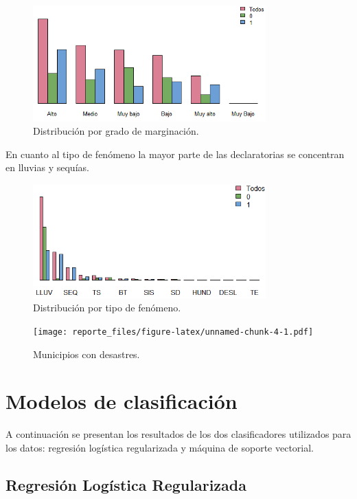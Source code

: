 \documentclass[]{article}
\begin{document}
\begin{figure}[H]
\centering
\includegraphics[width=0.8\textwidth]{img/dec_GM.png}
\caption{Distribución por grado de marginación.}

\end{figure}

En cuanto al tipo de fenómeno la mayor parte de las declaratorias se
concentran en lluvias y sequías.

\begin{figure}[H]
\centering
\includegraphics[width=0.8\textwidth]{img/tipo.png}
\caption{Distribución por tipo de fenómeno.}

\end{figure}

\begin{figure}[htbp]
\centering
\texttt{[image: reporte\_files/figure-latex/unnamed-chunk-4-1.pdf]}
\caption{Municipios con desastres.}
\end{figure}

\section{Modelos de clasificación}\label{modelos-de-clasificacion}

A continuación se presentan los resultados de los dos clasificadores
utilizados para los datos: regresión logística regularizada y máquina de
soporte vectorial.

\subsection{Regresión Logística
Regularizada}\label{regresion-logistica-regularizada}
\end{document}
